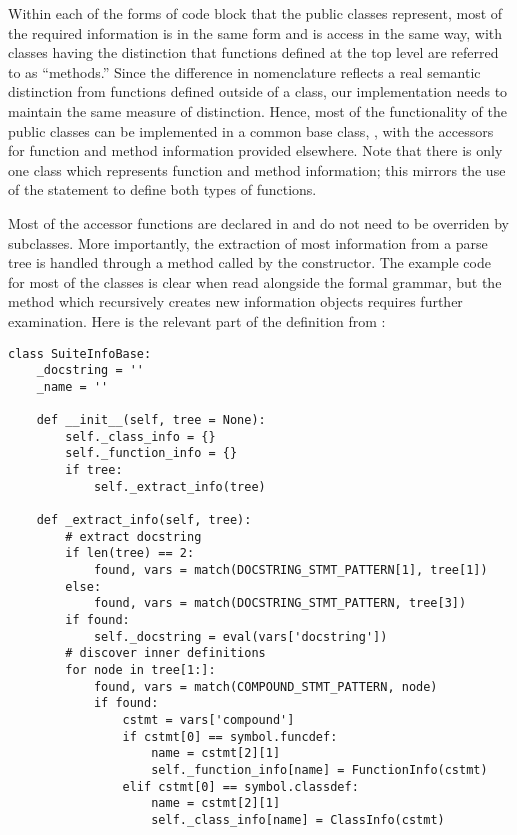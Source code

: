 Within each of the forms of code block that the public classes
represent, most of the required information is in the same form and is
access in the same way, with classes having the distinction that
functions defined at the top level are referred to as ``methods.''
Since the difference in nomenclature reflects a real semantic
distinction from functions defined outside of a class, our
implementation needs to maintain the same measure of distinction.
Hence, most of the functionality of the public classes can be
implemented in a common base class, , with the
accessors for function and method information provided elsewhere.
Note that there is only one class which represents function and method
information; this mirrors the use of the  statement to
define both types of functions.

Most of the accessor functions are declared in 
and do not need to be overriden by subclasses.  More importantly, the
extraction of most information from a parse tree is handled through a
method called by the  constructor.  The example
code for most of the classes is clear when read alongside the formal
grammar, but the method which recursively creates new information
objects requires further examination.  Here is the relevant part of
the  definition from :

\begin{verbatim}
class SuiteInfoBase:
    _docstring = ''
    _name = ''

    def __init__(self, tree = None):
        self._class_info = {}
        self._function_info = {}
        if tree:
            self._extract_info(tree)

    def _extract_info(self, tree):
        # extract docstring
        if len(tree) == 2:
            found, vars = match(DOCSTRING_STMT_PATTERN[1], tree[1])
        else:
            found, vars = match(DOCSTRING_STMT_PATTERN, tree[3])
        if found:
            self._docstring = eval(vars['docstring'])
        # discover inner definitions
        for node in tree[1:]:
            found, vars = match(COMPOUND_STMT_PATTERN, node)
            if found:
                cstmt = vars['compound']
                if cstmt[0] == symbol.funcdef:
                    name = cstmt[2][1]
                    self._function_info[name] = FunctionInfo(cstmt)
                elif cstmt[0] == symbol.classdef:
                    name = cstmt[2][1]
                    self._class_info[name] = ClassInfo(cstmt)
\end{verbatim}

